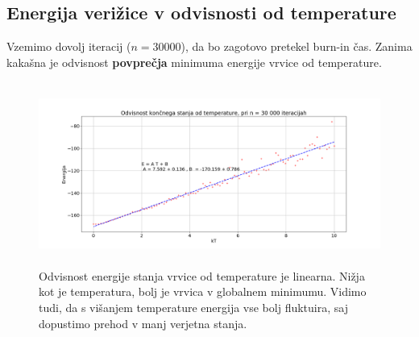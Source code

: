 \documentclass[11pt, a4paper]{article}
\begin{document}
\subsection{Energija verižice v odvisnosti od temperature }
Vzemimo dovolj iteracij ($n= 30000$), da bo zagotovo pretekel burn-in čas. Zanima kakašna je odvisnost \textbf{povprečja} minimuma energije vrvice od temperature. 
\begin{figure}[H]
\centering
  \includegraphics[width=16cm, height=6cm]{prva_energija.png}
\caption{Odvisnost energije stanja vrvice od temperature je linearna. Nižja kot je temperatura, bolj je vrvica v globalnem minimumu. Vidimo tudi, da s višanjem temperature energija vse bolj fluktuira, saj dopustimo prehod v manj verjetna stanja.}
\end{figure} 
\end{document}
